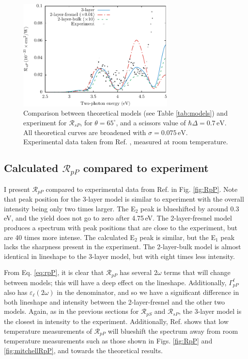 \begin{figure}
\centering
\includegraphics[width=0.7\textwidth]{content/figures/fig-4_4_04}
\caption{Comparison between theoretical models (see Table \ref{tab:models}) and
experiment for $\mathcal{R}_{sP}$, for $\theta=65^{\circ}$, and a scissors
value of $\hbar\Delta = 0.7\,\text{eV}$. All theoretical curves are broadened
with $\sigma=0.075\,\text{eV}$. Experimental data taken from Ref.
\cite{mejiaPRB02}, measured at room temperature.}
\label{fig:RsP}
\end{figure}



\subsection{Calculated \texorpdfstring{$\mathcal{R}_{pP}$}{RpP} compared to
experiment}\label{sec:1x1RpP}

I present $\mathcal{R}_{pP}$ compared to experimental data from Ref.
\cite{mejiaPRB02} in Fig. \ref{fig:RpP}. Note that peak position for the 3-layer
model is similar to experiment with the overall intensity being only two times
larger. The E$_{2}$ peak is blueshifted by around 0.3\,eV, and the yield does
not go to zero after 4.75\,eV. The 2-layer-fresnel model produces a spectrum
with peak positions that are close to the experiment, but are 40 times more
intense. The calculated E$_{2}$ peak is similar, but the E$_{1}$ peak lacks the
sharpness present in the experiment. The 2-layer-bulk model is almost identical
in lineshape to the 3-layer model, but with eight times less intensity.

From Eq. \eqref{eq:rpP}, it is clear that $\mathcal{R}_{pP}$ has several
$2\omega$ terms that will change between models; this will have a deep effect on
the lineshape. Additionally, $\Gamma^{\ell}_{pP}$ also has
$\varepsilon_{\ell}(2\omega)$ in the denominator, and so we have a significant
difference in both lineshape and intensity between the 2-layer-fresnel and the
other two models. Again, as in the previous sections for $\mathcal{R}_{pS}$ and
$\mathcal{R}_{sP}$, the 3-layer model is the closest in intensity to the
experiment. Additionally, Ref. \cite{dadapPRB97} shows that low temperature
measurements of $\mathcal{R}_{pP}$ will blueshift the spectrum away from room
temperature measurements such as those shown in Figs. \ref{fig:RpP} and
\ref{fig:mitchellRpP}, and towards the theoretical results.


